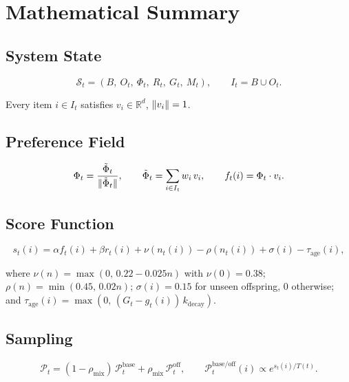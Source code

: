 \documentclass[12pt, a4paper]{article}
\DeclarePairedDelimiter{\norm}{\lVert}{\rVert}
\theoremstyle{definition}
\begin{document}
\section{Mathematical Summary}

\subsection{System State}

\begin{equation}
\mathcal{S}_t = (B,\ O_t,\ \Phi_t,\ R_t,\ G_t,\ M_t), \qquad I_t = B \cup O_t.
\end{equation}

Every item $i \in I_t$ satisfies $v_i \in \mathbb{R}^d$, $\norm{v_i} = 1$.

\subsection{Preference Field}

\begin{equation}
\Phi_t = \frac{\tilde\Phi_t}{\norm{\tilde\Phi_t}}, \qquad \tilde\Phi_t = \sum_{i \in I_t} w_i\, v_i, \qquad f_t(i) = \Phi_t \cdot v_i.
\end{equation}

\subsection{Score Function}

\begin{equation}
s_t(i) = \alpha f_t(i) + \beta r_t(i) + \nu(n_t(i)) - \rho(n_t(i)) + \sigma(i) - \tau_{\mathrm{age}}(i),
\end{equation}

where $\nu(n) = \max(0,\, 0.22 - 0.025n)$ with $\nu(0) = 0.38$; $\rho(n) = \min(0.45,\, 0.02n)$; $\sigma(i) = 0.15$ for unseen offspring, 0 otherwise; and $\tau_{\mathrm{age}}(i) = \max(0,\,(G_t - g_t(i))\,k_{\mathrm{decay}})$.

\subsection{Sampling}

\begin{equation}
\mathcal{P}_t = (1-\rho_{\mathrm{mix}})\,\mathcal{P}_t^{\mathrm{base}} + \rho_{\mathrm{mix}}\,\mathcal{P}_t^{\mathrm{off}}, \qquad \mathcal{P}_t^{\mathrm{base/off}}(i) \propto e^{s_t(i)/T(t)}.
\end{equation}
\end{document}
